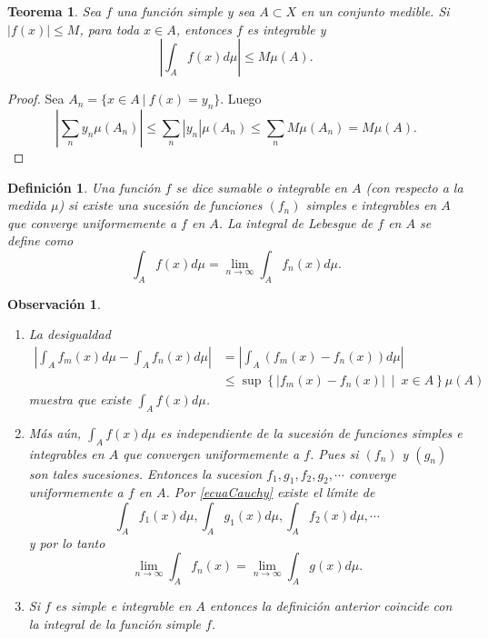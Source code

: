 \documentclass[twoside,12pt,a4 paper,openright]{book}
\newtheorem{teo}[claim]{Teorema}
\newtheorem{defi}[claim]{Definici\'on}
\newtheorem{ob}[claim]{Observaci\'on}
\begin{document}
\begin{teo}
    Sea $f$ una funci\'on simple  y sea  $A\subset X$  en un conjunto medible. Si   $|f(x)|\leq M$, para toda $x\in A$, entonces $f$ es  integrable y 
    $$\left| \int_A f(x) d\mu\right|\leq M\mu(A).$$
\end{teo}
\begin{proof}
    Sea $A_n = \{x\in A \ | \ f(x)= y_n\}$. Luego 
          $$\left|\sum_n y_n\mu(A_n)\right|\leq \sum_n |y_n|\mu(A_n)\leq\sum_n M\mu(A_n) = M \mu(A).$$
\end{proof}

\begin{defi}
    Una funci\'on $f$ se dice sumable o integrable en $A$ (con respecto a la medida $\mu$) si existe una sucesi\'on de funciones $(f_n)$ simples e integrables en $A$ que converge uniformemente a $f$ en $A$. La integral de Lebesgue de $f$ en $A$ se define  como 
    $$\int_A f(x)d\mu = \lim_{n\to \infty}\int_A f_n(x)d\mu.$$
\end{defi}


\begin{ob} {}\
    \begin{enumerate}
        \item La desigualdad
        \begin{align}\label{ecuaCauchy}
            \left|\int_A f_m(x)d\mu - \int_A f_n(x)d\mu\right| &= \left|\int_A(f_m(x) - f_n(x))d\mu\right|\nonumber \\
            &\leq \sup\left\{\left|f_m(x)-f_n(x)\right|  \  \mid \  x\in A\right\}\mu(A)
        \end{align}
   muestra      que existe $\displaystyle\int_A f(x)d\mu$.
        \item M\'as a\'un, $\int_A f(x)d\mu$ es independiente de la sucesi\'on de funciones simples e integrables en $A$ que convergen uniformemente a $f$. Pues si $(f_n)$ y $(g_n)$ son tales sucesiones. Entonces    la sucesion $f_1, g_1, f_2,g_2,\cdots$ converge uniformemente a $f$ en $A$. Por \eqref{ecuaCauchy} 
        existe   el l\'imite de 
        $$\displaystyle\int_A f_1(x)d\mu, \int_Ag_1(x)d\mu, \int_Af_2(x)d\mu,\cdots$$ y por lo tanto 
        $$\lim_{n\to\infty}\int_A f_n(x) = \lim_{n\to \infty}\int_A g(x)d\mu.$$


        \item Si $f$ es simple e integrable en $A$ entonces la definici\'on anterior coincide con la integral de la funci\'on simple $f$.
    \end{enumerate}
\end{ob}
\end{document}
